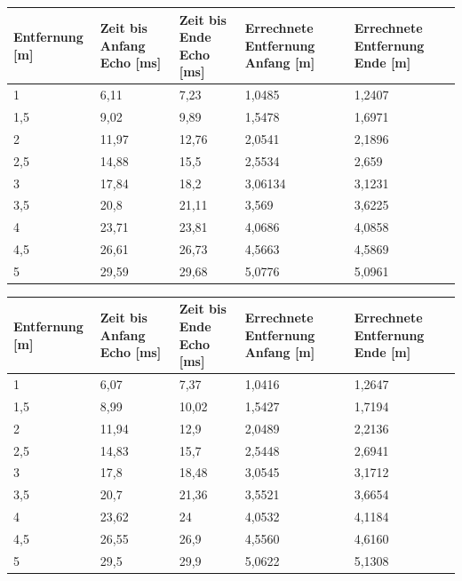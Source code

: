 \begin{minipage}{1\textwidth}
\label{tab:Entfernungsmessung5V}
\begin{tabularx}{\textwidth}{|p{}|p{}|p{}|p{}|X|}
\hline
Entfernung [m]& Zeit bis Anfang Echo [ms] & Zeit bis Ende Echo [ms] & Errechnete Entfernung Anfang [m] & Errechnete Entfernung Ende [m]\\
\hline
1 & 6,11 & 7,23 & 1,0485 & 1,2407\\
\hline
1,5 & 9,02 & 9,89 & 1,5478 & 1,6971\\
\hline
2 & 11,97 & 12,76 & 2,0541 & 2,1896\\
\hline
2,5 & 14,88 & 15,5 & 2,5534 & 2,659\\
\hline
3 & 17,84 & 18,2 & 3,06134 & 3,1231\\
\hline
3,5 & 20,8 & 21,11 & 3,569 & 3,6225\\
\hline
4 & 23,71 & 23,81 & 4,0686 & 4,0858\\
\hline
4,5 & 26,61 & 26,73 & 4,5663 & 4,5869\\
\hline
5 & 29,59 & 29,68 & 5,0776 & 5,0961\\
\hline
\end{tabularx}
\end{minipage}
\begin{minipage}{1\textwidth}
\label{tab:Entfernungsmessung10V}
\begin{tabularx}{\textwidth}{|p{}|p{}|p{}|p{}|X|}
\hline
Entfernung [m]& Zeit bis Anfang Echo [ms] & Zeit bis Ende Echo [ms] & Errechnete Entfernung Anfang [m] & Errechnete Entfernung Ende [m]\\
\hline
1 & 6,07 & 7,37 & 1,0416 & 1,2647\\
\hline
1,5 & 8,99 & 10,02 & 1,5427 & 1,7194\\
\hline
2 & 11,94 & 12,9 & 2,0489 & 2,2136\\
\hline
2,5 & 14,83 & 15,7 & 2,5448 & 2,6941\\
\hline
3 & 17,8 & 18,48 & 3,0545 & 3,1712\\
\hline
3,5 & 20,7 & 21,36 & 3,5521 & 3,6654\\
\hline
4 & 23,62 & 24 & 4,0532 & 4,1184\\
\hline
4,5 & 26,55 & 26,9 & 4,5560 & 4,6160\\
\hline
5 & 29,5 & 29,9 & 5,0622 & 5,1308\\
\hline
\end{tabularx}
\end{minipage}
